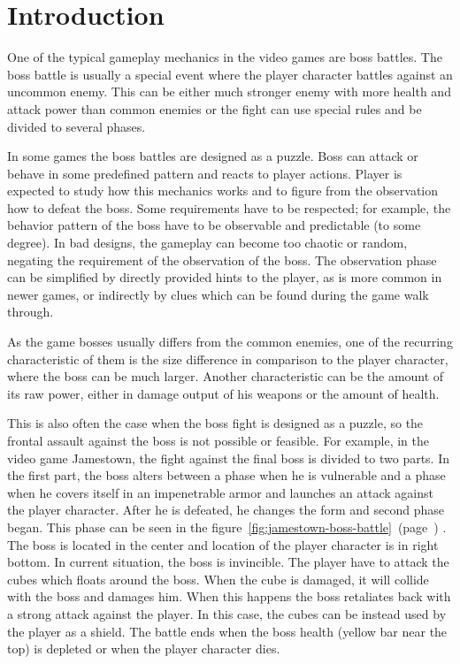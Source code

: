 \documentclass[a4paper]{article}
\newcommand{\reffigure}[1]
{
	figure~\ref{fig:#1}~(page~\pageref{fig:#1})%
}
\begin{document}
\section{Introduction}

\setcounter{page}{1}

One of the typical gameplay mechanics in the video games are boss battles. The boss battle is usually a special event where the player character battles against an uncommon enemy. This can be either much stronger enemy with more health and attack power than common enemies or the fight can use special rules and be divided to several phases.


In some games the boss battles are designed as a puzzle. Boss can attack or behave in some predefined pattern and reacts to player actions. Player is expected to study how this mechanics works and to figure from the observation how to defeat the boss. Some requirements have to be respected; for example, the behavior pattern of the boss have to be observable and predictable (to some degree). In bad designs, the gameplay can become too chaotic or random, negating the requirement of the observation of the boss. The observation phase can be simplified by directly provided hints to the player, as is more common in newer games, or indirectly by clues which can be found during the game walk through.

As the game bosses usually differs from the common enemies, one of the recurring characteristic of them is the size difference in comparison to the player character, where the boss can be much larger. Another characteristic can be the amount of its raw power, either in damage output of his weapons or the amount of health.


This is also often the case when the boss fight is designed as a puzzle, so the frontal assault against the boss is not possible or feasible. For example, in the video game Jamestown, the fight against the final boss is divided to two parts. In the first part, the boss alters between a phase when he is vulnerable and a phase when he covers itself in an impenetrable armor and launches an attack against the player character. After he is defeated, he changes the form and second phase began. This phase can be seen in the \reffigure{jamestown-boss-battle}. The boss is located in the center and location of the player character is in right bottom. In current situation, the boss is invincible. The player have to attack the cubes which floats around the boss. When the cube is damaged, it will collide with the boss and damages him. When this happens the boss retaliates back with a strong attack against the player. In this case, the cubes can be instead used by the player as a shield. The battle ends when the boss health (yellow bar near the top) is depleted or when the player character dies.
\end{document}
